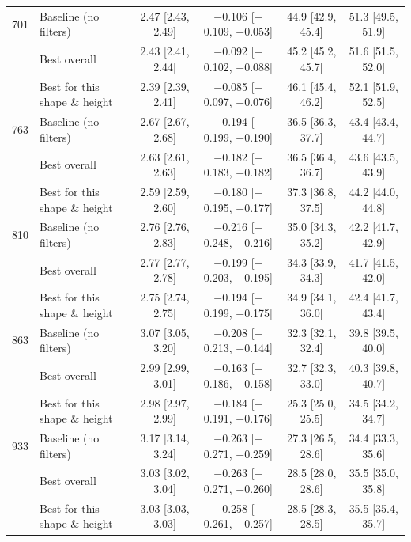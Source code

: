 \begin{table}[H]
\begin{tabular}{r l *{4}{c}}
		701 & Baseline (no filters) & 2.47 [2.43, 2.49] & $-$0.106 [$-$0.109, $-$0.053] & 44.9 [42.9, 45.4] & 51.3 [49.5, 51.9] \\
		 & Best overall & 2.43 [2.41, 2.44] & $-$0.092 [$-$0.102, $-$0.088] & 45.2 [45.2, 45.7] & 51.6 [51.5, 52.0] \\
		 & Best for this shape \& height & 2.39 [2.39, 2.41] & $-$0.085 [$-$0.097, $-$0.076] & 46.1 [45.4, 46.2] & 52.1 [51.9, 52.5] \\
		763 & Baseline (no filters) & 2.67 [2.67, 2.68] & $-$0.194 [$-$0.199, $-$0.190] & 36.5 [36.3, 37.7] & 43.4 [43.4, 44.7] \\
		 & Best overall & 2.63 [2.61, 2.63] & $-$0.182 [$-$0.183, $-$0.182] & 36.5 [36.4, 36.7] & 43.6 [43.5, 43.9] \\
		 & Best for this shape \& height & 2.59 [2.59, 2.60] & $-$0.180 [$-$0.195, $-$0.177] & 37.3 [36.8, 37.5] & 44.2 [44.0, 44.8] \\
		810 & Baseline (no filters) & 2.76 [2.76, 2.83] & $-$0.216 [$-$0.248, $-$0.216] & 35.0 [34.3, 35.2] & 42.2 [41.7, 42.9] \\
		 & Best overall & 2.77 [2.77, 2.78] & $-$0.199 [$-$0.203, $-$0.195] & 34.3 [33.9, 34.3] & 41.7 [41.5, 42.0] \\
		 & Best for this shape \& height & 2.75 [2.74, 2.75] & $-$0.194 [$-$0.199, $-$0.175] & 34.9 [34.1, 36.0] & 42.4 [41.7, 43.4] \\
		863 & Baseline (no filters) & 3.07 [3.05, 3.20] & $-$0.208 [$-$0.213, $-$0.144] & 32.3 [32.1, 32.4] & 39.8 [39.5, 40.0] \\
		 & Best overall & 2.99 [2.99, 3.01] & $-$0.163 [$-$0.186, $-$0.158] & 32.7 [32.3, 33.0] & 40.3 [39.8, 40.7] \\
		 & Best for this shape \& height & 2.98 [2.97, 2.99] & $-$0.184 [$-$0.191, $-$0.176] & 25.3 [25.0, 25.5] & 34.5 [34.2, 34.7] \\
		933 & Baseline (no filters) & 3.17 [3.14, 3.24] & $-$0.263 [$-$0.271, $-$0.259] & 27.3 [26.5, 28.6] & 34.4 [33.3, 35.6] \\
		 & Best overall & 3.03 [3.02, 3.04] & $-$0.263 [$-$0.271, $-$0.260] & 28.5 [28.0, 28.6] & 35.5 [35.0, 35.8] \\
		 & Best for this shape \& height & 3.03 [3.03, 3.03] & $-$0.258 [$-$0.261, $-$0.257] & 28.5 [28.3, 28.5] & 35.5 [35.4, 35.7] \\
		\bottomrule
	\end{tabular}
\end{table}
